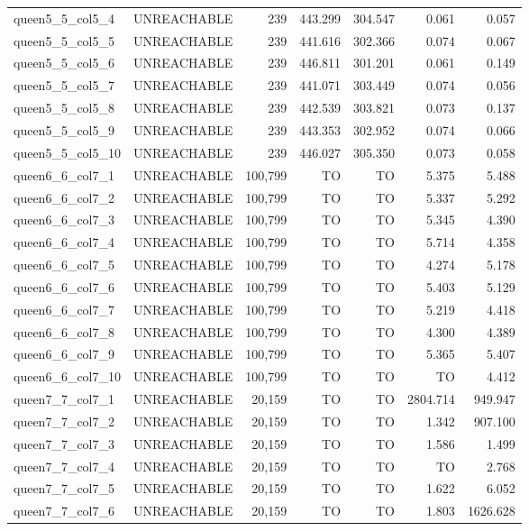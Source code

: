 \begin{tabular}{llr|rrrr}
  queen5\_5\_col5\_4 & UNREACHABLE & 239 & 443.299 & 304.547 & 0.061 & 0.057 \\
  queen5\_5\_col5\_5 & UNREACHABLE & 239 & 441.616 & 302.366 & 0.074 & 0.067 \\
  queen5\_5\_col5\_6 & UNREACHABLE & 239 & 446.811 & 301.201 & 0.061 & 0.149 \\
  queen5\_5\_col5\_7 & UNREACHABLE & 239 & 441.071 & 303.449 & 0.074 & 0.056 \\
  queen5\_5\_col5\_8 & UNREACHABLE & 239 & 442.539 & 303.821 & 0.073 & 0.137 \\
  queen5\_5\_col5\_9 & UNREACHABLE & 239 & 443.353 & 302.952 & 0.074 & 0.066 \\ %
  queen5\_5\_col5\_10 & UNREACHABLE & 239 & 446.027 & 305.350 & 0.073 & 0.058 \\
  queen6\_6\_col7\_1 & UNREACHABLE & 100,799 & TO & TO & 5.375 & 5.488 \\
  queen6\_6\_col7\_2 & UNREACHABLE & 100,799 & TO & TO & 5.337 & 5.292 \\
  queen6\_6\_col7\_3 & UNREACHABLE & 100,799 & TO & TO & 5.345 & 4.390 \\
  queen6\_6\_col7\_4 & UNREACHABLE & 100,799 & TO & TO & 5.714 & 4.358 \\
  queen6\_6\_col7\_5 & UNREACHABLE & 100,799 & TO & TO & 4.274 & 5.178 \\
  queen6\_6\_col7\_6 & UNREACHABLE & 100,799 & TO & TO & 5.403 & 5.129 \\
  queen6\_6\_col7\_7 & UNREACHABLE & 100,799 & TO & TO & 5.219 & 4.418 \\
  queen6\_6\_col7\_8 & UNREACHABLE & 100,799 & TO & TO & 4.300 & 4.389 \\
  queen6\_6\_col7\_9 & UNREACHABLE & 100,799 & TO & TO & 5.365 & 5.407 \\ %
  queen6\_6\_col7\_10 & UNREACHABLE & 100,799 & TO & TO & TO & 4.412 \\
  queen7\_7\_col7\_1 & UNREACHABLE & 20,159 & TO & TO & 2804.714 & 949.947 \\
  queen7\_7\_col7\_2 & UNREACHABLE & 20,159 & TO & TO & 1.342 & 907.100 \\
  queen7\_7\_col7\_3 & UNREACHABLE & 20,159 & TO & TO & 1.586 & 1.499 \\
  queen7\_7\_col7\_4 & UNREACHABLE & 20,159 & TO & TO & TO & 2.768 \\
  queen7\_7\_col7\_5 & UNREACHABLE & 20,159 & TO & TO & 1.622 & 6.052 \\
  queen7\_7\_col7\_6 & UNREACHABLE & 20,159 & TO & TO & 1.803 & 1626.628 \\

\end{tabular}
